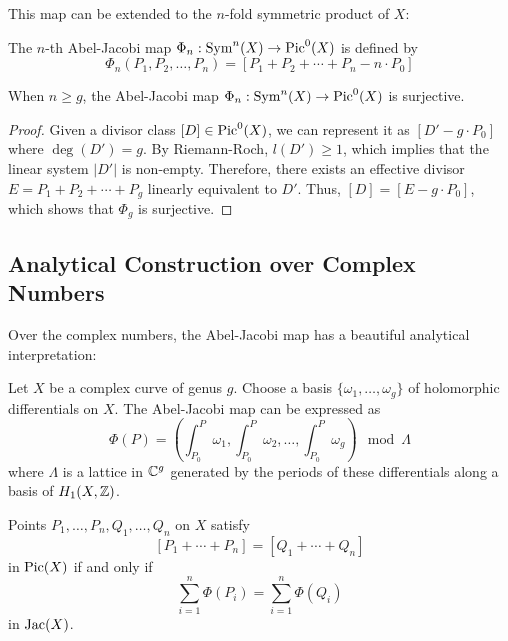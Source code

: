 \documentclass[12pt]{article}
\begin{document}
This map can be extended to the $n$-fold symmetric product of $X$:



\begin{definition}
    The $n$-th Abel-Jacobi map $\Phi_n: \operatorname{Sym}^n(X) \to \operatorname{Pic}^0(X)$ is defined by
    \[\Phi_n(P_1, P_2, \ldots, P_n) = [P_1 + P_2 + \cdots + P_n - n \cdot P_0]\]
\end{definition}

\begin{theorem}
    When $n \geq g$, the Abel-Jacobi map $\Phi_n: \operatorname{Sym}^n(X) \to \operatorname{Pic}^0(X)$ is surjective.
\end{theorem}

\begin{proof}
    Given a divisor class $[D] \in \operatorname{Pic}^0(X)$, we can represent it as $[D' - g \cdot P_0]$ where $\deg(D') = g$. By Riemann-Roch, $l(D') \geq 1$, which implies that the linear system $|D'|$ is non-empty. Therefore, there exists an effective divisor $E = P_1 + P_2 + \cdots + P_g$ linearly equivalent to $D'$. Thus, $[D] = [E - g \cdot P_0]$, which shows that $\Phi_g$ is surjective.
\end{proof}

\subsection{Analytical Construction over Complex Numbers}

Over the complex numbers, the Abel-Jacobi map has a beautiful analytical interpretation:

\begin{proposition}
    Let $X$ be a complex curve of genus $g$. Choose a basis $\{\omega_1, \ldots, \omega_g\}$ of holomorphic differentials on $X$. The Abel-Jacobi map can be expressed as
    \[\Phi(P) = \left(\int_{P_0}^P \omega_1, \int_{P_0}^P \omega_2, \ldots, \int_{P_0}^P \omega_g\right) \mod \Lambda\]
    where $\Lambda$ is a lattice in $\mathbb{C}^g$ generated by the periods of these differentials along a basis of $H_1(X, \mathbb{Z})$.
\end{proposition}

\begin{theorem}
    Points $P_1, \ldots, P_n, Q_1, \ldots, Q_n$ on $X$ satisfy
    \[[P_1 + \cdots + P_n] = [Q_1 + \cdots + Q_n]\]
    in $\operatorname{Pic}(X)$ if and only if
    \[\sum_{i=1}^n \Phi(P_i) = \sum_{i=1}^n \Phi(Q_i)\]
    in $\operatorname{Jac}(X)$.
\end{theorem}
\end{document}

